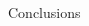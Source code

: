 \documentclass[final,t,overlay, xcolor=table, sans, mathserif]{beamer}
\begin{document}
\begin{frame}{}
\begin{columns}[t]
\begin{column}{.7\linewidth}
\begin{block}{Conclusions}
\end{block}




\end{column}



\end{columns}

\end{frame}
\end{document}
